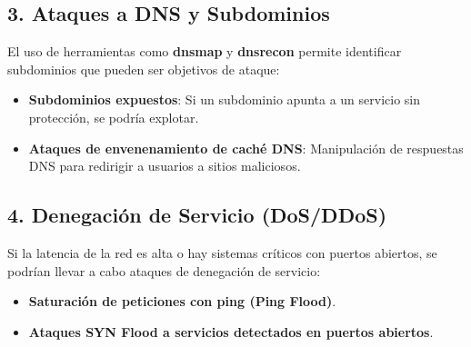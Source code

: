 \subsection{3. Ataques a DNS y Subdominios}
El uso de herramientas como \textbf{dnsmap} y \textbf{dnsrecon} permite identificar subdominios que pueden ser objetivos de ataque:
\begin{itemize}
    \item \textbf{Subdominios expuestos}: Si un subdominio apunta a un servicio sin protección, se podría explotar.
    \item \textbf{Ataques de envenenamiento de caché DNS}: Manipulación de respuestas DNS para redirigir a usuarios a sitios maliciosos.
\end{itemize}

\subsection{4. Denegación de Servicio (DoS/DDoS)}
Si la latencia de la red es alta o hay sistemas críticos con puertos abiertos, se podrían llevar a cabo ataques de denegación de servicio:
\begin{itemize}
    \item \textbf{Saturación de peticiones con ping (Ping Flood)}.
    \item \textbf{Ataques SYN Flood a servicios detectados en puertos abiertos}.
\end{itemize}